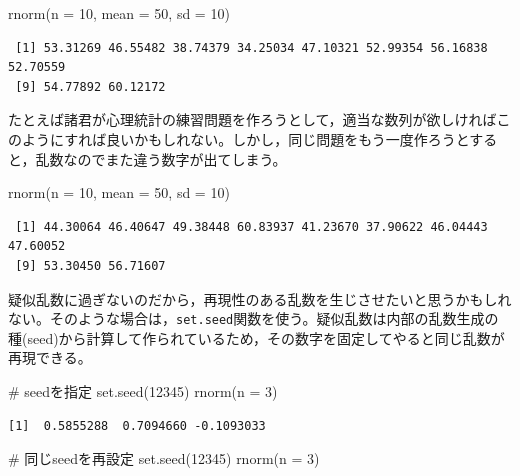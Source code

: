 \documentclass[
  a4paper,
]{ltjsbook}
\newenvironment{Shaded}{\begin{snugshade}}{\end{snugshade}}
\newcommand{\AttributeTok}[1]{\textcolor[rgb]{0.40,0.45,0.13}{#1}}
\newcommand{\CommentTok}[1]{\textcolor[rgb]{0.37,0.37,0.37}{#1}}
\newcommand{\DecValTok}[1]{\textcolor[rgb]{0.68,0.00,0.00}{#1}}
\newcommand{\FunctionTok}[1]{\textcolor[rgb]{0.28,0.35,0.67}{#1}}
\newcommand{\NormalTok}[1]{\textcolor[rgb]{0.00,0.23,0.31}{#1}}
\begin{document}
\begin{Shaded}
\begin{Highlighting}[]
\FunctionTok{rnorm}\NormalTok{(}\AttributeTok{n =} \DecValTok{10}\NormalTok{, }\AttributeTok{mean =} \DecValTok{50}\NormalTok{, }\AttributeTok{sd =} \DecValTok{10}\NormalTok{)}
\end{Highlighting}
\end{Shaded}

\begin{verbatim}
 [1] 53.31269 46.55482 38.74379 34.25034 47.10321 52.99354 56.16838 52.70559
 [9] 54.77892 60.12172
\end{verbatim}

たとえば諸君が心理統計の練習問題を作ろうとして，適当な数列が欲しければこのようにすれば良いかもしれない。しかし，同じ問題をもう一度作ろうとすると，乱数なのでまた違う数字が出てしまう。

\begin{Shaded}
\begin{Highlighting}[]
\FunctionTok{rnorm}\NormalTok{(}\AttributeTok{n =} \DecValTok{10}\NormalTok{, }\AttributeTok{mean =} \DecValTok{50}\NormalTok{, }\AttributeTok{sd =} \DecValTok{10}\NormalTok{)}
\end{Highlighting}
\end{Shaded}

\begin{verbatim}
 [1] 44.30064 46.40647 49.38448 60.83937 41.23670 37.90622 46.04443 47.60052
 [9] 53.30450 56.71607
\end{verbatim}

疑似乱数に過ぎないのだから，再現性のある乱数を生じさせたいと思うかもしれない。そのような場合は，\texttt{set.seed}関数を使う。疑似乱数は内部の乱数生成の種(seed)から計算して作られているため，その数字を固定してやると同じ乱数が再現できる。

\begin{Shaded}
\begin{Highlighting}[]
\CommentTok{\# seedを指定}
\FunctionTok{set.seed}\NormalTok{(}\DecValTok{12345}\NormalTok{)}
\FunctionTok{rnorm}\NormalTok{(}\AttributeTok{n =} \DecValTok{3}\NormalTok{)}
\end{Highlighting}
\end{Shaded}

\begin{verbatim}
[1]  0.5855288  0.7094660 -0.1093033
\end{verbatim}

\begin{Shaded}
\begin{Highlighting}[]
\CommentTok{\# 同じseedを再設定}
\FunctionTok{set.seed}\NormalTok{(}\DecValTok{12345}\NormalTok{)}
\FunctionTok{rnorm}\NormalTok{(}\AttributeTok{n =} \DecValTok{3}\NormalTok{)}
\end{Highlighting}
\end{Shaded}
\end{document}
